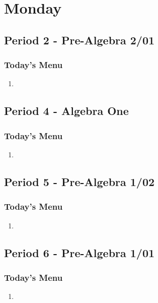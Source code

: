    \section[Mon]{Monday}
   \subsection[PA2/01]{Period 2 - Pre-Algebra 2/01}
   \begin{frame}[label=PA2_01]
   	\frametitle{Today's Menu}
   	
   	     \begin{enumerate}
   	   	   \item
   	   	   \rightarrowitem
   	     \end{enumerate}
   
      	\end{frame}   
   	
    \subsection[ALG]{Period 4 - Algebra One}
   	 \begin{frame}[label=ALG1]
   	 	\frametitle{Today's Menu}
   	 	
   	 	 \begin{enumerate}
   	   	   \item
   	   	   \rightarrowitem
   	     \end{enumerate}
   	 
   	 \end{frame}
   	 \subsection[PA1/02]{Period 5 - Pre-Algebra 1/02}
   	    \begin{frame}[label=PA1_02]
   	 	\frametitle{Today's Menu}
   	 	
   	 	 \begin{enumerate}
   	   	   \item
   	   	   \rightarrowitem
   	     \end{enumerate}
   	 	
   	      \end{frame}
   	 \subsection[PA1/01]{Period 6 - Pre-Algebra 1/01}
   	   \begin{frame}[label=PA1_01]
   	 	\frametitle{Today's Menu}
   	 	
   	 	 \begin{enumerate}
   	   	   \item
   	   	   \rightarrowitem
   	     \end{enumerate}
   	 	
   	         \end{frame}
